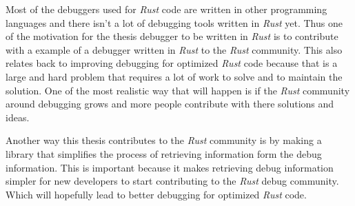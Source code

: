 Most of the debuggers used for \emph{Rust} code are written in other programming languages and there isn't a lot of debugging tools written in \emph{Rust} yet.
Thus one of the motivation for the thesis debugger to be written in \emph{Rust} is to contribute with a example of a debugger written in \emph{Rust} to the \emph{Rust} community.
This also relates back to improving debugging for optimized \emph{Rust} code because that is a large and hard problem that requires a lot of work to solve and to maintain the solution.
One of the most realistic way that will happen is if the \emph{Rust} community around debugging grows and more people contribute with there solutions and ideas.


Another way this thesis contributes to the \emph{Rust} community is by making a library that simplifies the process of retrieving information form the debug information.
This is important because it makes retrieving debug information simpler for new developers to start contributing to the \emph{Rust} debug community.
Which will hopefully lead to better debugging for optimized \emph{Rust} code.




